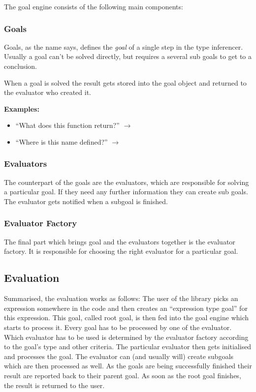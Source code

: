 \documentclass[12pt,halfparskip,DIV11,BCOR10mm]{scrreprt}
\begin{document}
The goal engine consists of the following main components:

\subsubsection{Goals}
Goals, as the name says, defines the \emph{goal} of a single step in the type inferencer. Usually a goal can't be solved directly, but requires a several sub goals to get to a conclusion.

When a goal is solved the result gets stored into the goal object and returned to the evaluator who created it.

\textbf{Examples:}

\begin{itemize}
	\item ``What does this function return?''  $\rightarrow$  
	\item ``Where is this name defined?'' $\rightarrow$ 
\end{itemize}

\subsubsection{Evaluators}

The counterpart of the goals are the evaluators, which are responsible for solving a particular goal. If they need any further information they can create sub goals. The evaluator gets notified when a subgoal is finished.

\subsubsection{Evaluator Factory}

The final part which brings goal and the evaluators together is the evaluator factory. It is responsible for choosing the right evaluator for a particular goal. 

\subsection{Evaluation}

Summarised, the evaluation works as follows: The user of the library picks an expression somewhere in the code and then creates an ``expression type goal'' for this expression. This goal, called root goal, is then fed into the goal engine which starts to process it. Every goal has to be processed by one of the evaluator. Which evaluator has to be used is determined by the evaluator factory according to the goal's type and other criteria. The particular evaluator then gets initialised and processes the goal. The evaluator can (and usually will) create subgoals which are then processed as well. As the goals are being successfully finished their result are reported back to their parent goal. As soon as the root goal finishes, the result is returned to the user.
\end{document}
